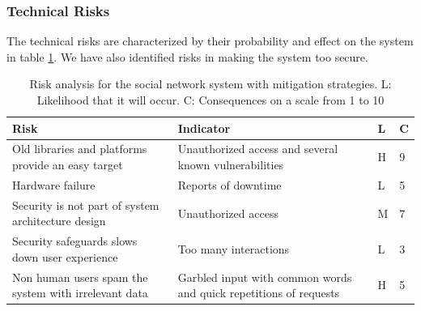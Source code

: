 \documentclass[a4paper]{article}
\begin{document}
\subsubsection{Technical Risks}
The technical risks are characterized by their probability and effect on the system in table \ref{tab:risk_analysis}. We have also identified risks in making the system too secure.

\begin{table}[h!]
	\begin{tabular}{| p{5cm} | p{5cm} | l | l |}
		\hline
		\textbf{Risk} & \textbf{Indicator} & \textbf{L} & \textbf{C}  \\ \hline
        Old libraries and platforms provide an easy target & Unauthorized access and several known vulnerabilities \cite{CVEdb} & H & 9 \\\hline
        Hardware failure & Reports of downtime & L & 5 \\ \hline
        Security is not part of system architecture design & Unauthorized access & M & 7 \\ \hline
		Security safeguards slows down user experience & Too many interactions & L & 3
		\\ \hline
		Non human users spam the system with irrelevant data & Garbled input with common words and quick repetitions of requests & H & 5
				\\ \hline
	\end{tabular}
	\caption{Risk analysis for the social network system with mitigation strategies. L: Likelihood that it will occur. C: Consequences on a scale from 1 to 10}
	\label{tab:risk_analysis}
	

\end{table}
\end{document}
